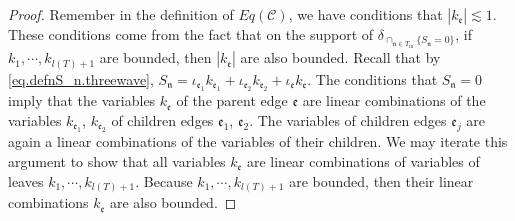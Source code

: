 \begin{proof}
Remember in the definition of $Eq(\mathcal{C})$, we have conditions that $|k_{\mathfrak{e}}|\lesssim 1$. These conditions come from the fact that on the support of $\delta_{\cap_{\mathfrak{n}\in T_{\text{in}}} \{S_{\mathfrak{n}}=0\}}$, if $k_1,\cdots,k_{l(T)+1}$ are bounded, then $|k_{\mathfrak{e}}|$ are also bounded. Recall that by \eqref{eq.defnS_n.threewave}, $S_{\mathfrak{n}}=\iota_{\mathfrak{e}_1}k_{\mathfrak{e}_1}+\iota_{\mathfrak{e}_2}k_{\mathfrak{e}_2}+\iota_{\mathfrak{e}}k_{\mathfrak{e}}$. The conditions that $S_{\mathfrak{n}}=0$ imply that the variables $k_{\mathfrak{e}}$ of the parent edge $\mathfrak{e}$ are linear combinations of the variables $k_{\mathfrak{e}_1}$, $k_{\mathfrak{e}_2}$ of children edges $\mathfrak{e}_1$, $\mathfrak{e}_2$. The variables of children edges $\mathfrak{e}_j$ are again a linear combinations of the variables of their children. We may iterate this argument to show that all variables $k_{\mathfrak{e}}$ are linear combinations of variables of leaves $k_1,\cdots,k_{l(T)+1}$. Because $k_1,\cdots,k_{l(T)+1}$ are bounded, then their linear combinations $k_{\mathfrak{e}}$ are also bounded.


\end{proof}
